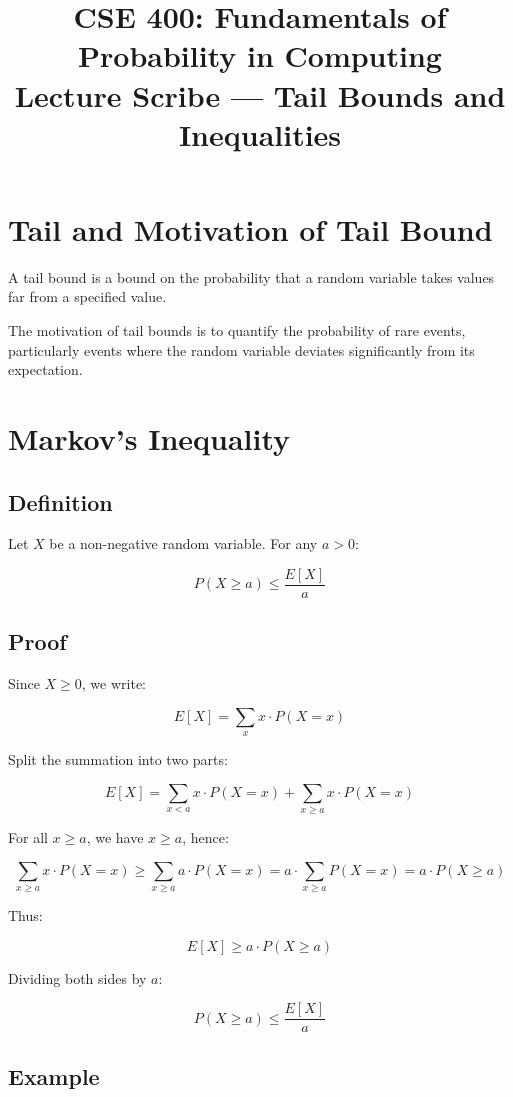 \documentclass[12pt]{article}
\title{CSE 400: Fundamentals of Probability in Computing\\
Lecture Scribe — Tail Bounds and Inequalities}
\date{}
\begin{document}
\maketitle

\section*{Tail and Motivation of Tail Bound}

A tail bound is a bound on the probability that a random variable takes values far from a specified value.

The motivation of tail bounds is to quantify the probability of rare events, particularly events where the random variable deviates significantly from its expectation.

\section*{Markov’s Inequality}

\subsection*{Definition}

Let $X$ be a non-negative random variable. For any $a > 0$:

\[
P(X \ge a) \le \frac{E[X]}{a}
\]

\subsection*{Proof}

Since $X \ge 0$, we write:

\[
E[X] = \sum_x x \cdot P(X = x)
\]

Split the summation into two parts:

\[
E[X] =
\sum_{x < a} x \cdot P(X = x) +
\sum_{x \ge a} x \cdot P(X = x)
\]

For all $x \ge a$, we have $x \ge a$, hence:

\[
\sum_{x \ge a} x \cdot P(X = x) \ge
\sum_{x \ge a} a \cdot P(X = x)
= a \cdot \sum_{x \ge a} P(X = x)
= a \cdot P(X \ge a)
\]

Thus:

\[
E[X] \ge a \cdot P(X \ge a)
\]

Dividing both sides by $a$:

\[
P(X \ge a) \le \frac{E[X]}{a}
\]

\subsection*{Example}
\end{document}
